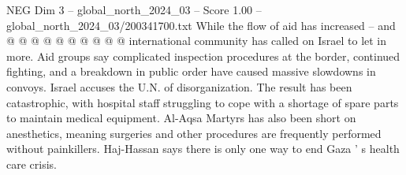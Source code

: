 \begin{textsample}{NEG Dim 3 – global\_north\_2024\_03 – Score 1.00 – global\_north\_2024\_03/200341700.txt}
While the flow of aid has increased -- and @ @ @ @ @ @ @ @ @ @ international community has called on Israel to let in more.
Aid groups say complicated inspection procedures at the border, continued fighting, and a breakdown in public order have caused massive slowdowns in convoys.
Israel accuses the U.N. of disorganization.
The result has been catastrophic, with hospital staff struggling to cope with a shortage of spare parts to maintain medical equipment.
Al-Aqsa Martyrs has also been short on anesthetics, meaning surgeries and other procedures are frequently performed without painkillers.
Haj-Hassan says there is only one way to end Gaza ' s health care crisis.

\end{textsample}
